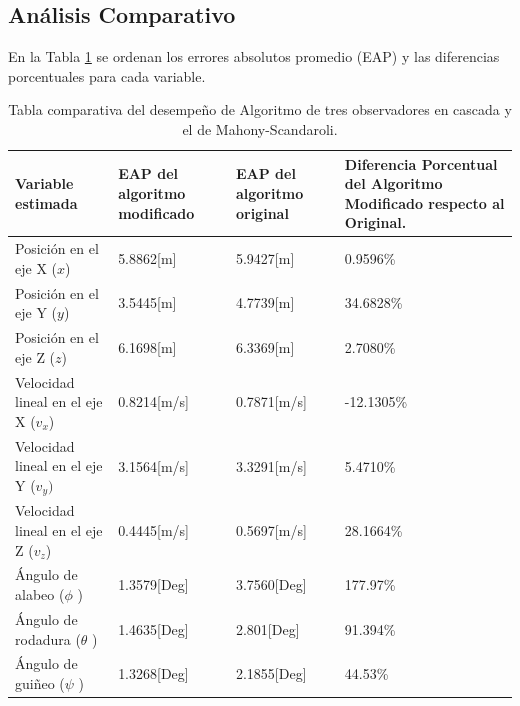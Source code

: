 \documentclass[conference]{IEEEtran}
\begin{document}
\subsection{Análisis Comparativo}
En la Tabla \ref{resultados_tb1} se ordenan los errores absolutos promedio (EAP) y las diferencias porcentuales para cada variable.\par
%
\begin{table}[!t]
\caption{Tabla comparativa del desempeño de Algoritmo de tres observadores en cascada y el de Mahony-Scandaroli.}
\label{resultados_tb1}
\begin{center}\scriptsize
\begin{tabular}{|p{0.6in}|p{0.7in}|p{0.7in}|p{0.7in}|} \hline
\textbf{Variable estimada}&\textbf{EAP del algoritmo modificado}&\textbf{EAP del algoritmo original}&\textbf{Diferencia Porcentual del Algoritmo Modificado respecto al Original.} \\ \hline
Posición en el eje X ($x$) &5.8862[m]&5.9427[m]&0.9596\%\\ \hline
Posición en el eje Y ($y$) &3.5445[m]&4.7739[m]&34.6828\%\\ \hline
Posición en el eje Z ($z$)&6.1698[m]&6.3369[m]&2.7080\%\\ \hline
Velocidad lineal en el eje X ($v_x$) &0.8214[m/s]&0.7871[m/s]&{-12.1305\%}\\ \hline
Velocidad lineal en el eje Y ($v_y)$&3.1564[m/s]&3.3291[m/s]&5.4710\%\\ \hline
Velocidad lineal en el eje Z ($v_z$)&0.4445[m/s]&0.5697[m/s]&28.1664\%\\ \hline
Ángulo de alabeo ($\phi$ )&1.3579[Deg]&3.7560[Deg]&177.97\%\\ \hline
Ángulo de rodadura ($\theta$ )&1.4635[Deg]&2.801[Deg]&91.394\%\\ \hline
Ángulo de guiñeo ($\psi$ )&1.3268[Deg]&2.1855[Deg]&44.53\%\\ \hline
\end{tabular}
\end{center}
\end{table}
\end{document}
